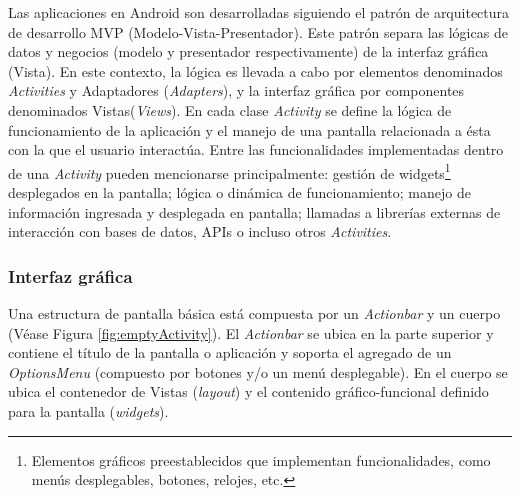     \par Las aplicaciones en Android son desarrolladas siguiendo el patrón de arquitectura de desarrollo MVP (Modelo-Vista-Presentador). Este patrón separa las lógicas de datos y negocios (modelo y presentador respectivamente) de la interfaz gráfica (Vista). En este contexto, la lógica es llevada a cabo por elementos denominados \textit{Activities} y Adaptadores (\textit{Adapters}), y la interfaz gráfica por componentes denominados Vistas(\textit{Views}). En cada clase \textit{\gls{Activity}} se define la lógica de funcionamiento de la aplicación y el manejo de una pantalla relacionada a ésta con la que el usuario interactúa. Entre las funcionalidades implementadas dentro de una \textit{Activity} pueden mencionarse principalmente: gestión de widgets\footnote{Elementos gráficos preestablecidos que implementan funcionalidades, como menús desplegables, botones, relojes, etc.} desplegados en la pantalla; lógica o dinámica de funcionamiento; manejo de información ingresada y desplegada en pantalla; llamadas a librerías externas de interacción con bases de datos, APIs o incluso otros \textit{Activities}.
    
    \subsubsection{Interfaz gráfica}
    \label{explicacionInterfazGrafica}
    
    \par Una estructura de pantalla básica está compuesta por un \textit{Actionbar} y un cuerpo (Véase Figura \ref{fig:emptyActivity}). El \textit{Actionbar} se ubica en la parte superior y contiene el título de la pantalla o aplicación y soporta el agregado de un \textit{OptionsMenu} (compuesto por botones y/o un menú desplegable). En el cuerpo se ubica el contenedor de Vistas (\textit{layout}) y el contenido gráfico-funcional definido para la pantalla (\textit{widgets}).
    
